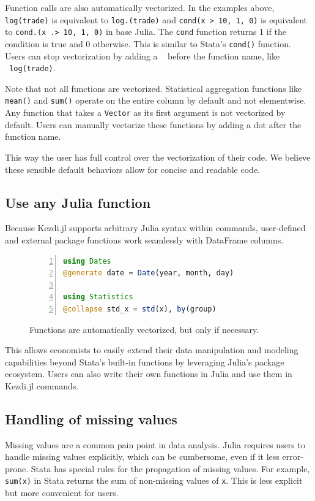 \documentclass{juliacon}
\begin{document}
Function calls are also automatically vectorized. In the examples above, \texttt{log(trade)} is equivalent to \texttt{log.(trade)} and \texttt{cond(x > 10, 1, 0)} is equivalent to \texttt{cond.(x .> 10, 1, 0)} in base Julia. The \texttt{cond} function returns 1 if the condition is true and 0 otherwise. This is similar to Stata's \texttt{cond()} function. Users can stop vectorization by adding a \texttt{~} before the function name, like \texttt{~log(trade)}.

Note that not all functions are vectorized. Statistical aggregation functions like \texttt{mean()} and \texttt{sum()} operate on the entire column by default and not elementwise. Any function that takes a \texttt{Vector} as its first argument is not vectorized by default. Users can manually vectorize these functions by adding a dot after the function name.

This way the user has full control over the vectorization of their code. We believe these sensible default behaviors allow for concise and readable code.

\subsection{Use any Julia function}

Because Kezdi.jl supports arbitrary Julia syntax within commands, user-defined and external package functions work seamlessly with DataFrame columns.

\begin{figure}[t]
\begin{lstlisting}[language = Julia, numbers=left, numberstyle=\tiny\color{gray}]
using Dates
@generate date = Date(year, month, day)

using Statistics
@collapse std_x = std(x), by(group) 
\end{lstlisting}
	
\caption{Functions are automatically vectorized, but only if necessary.}
\label{fig:vectorization}
\end{figure}

This allows economists to easily extend their data manipulation and modeling capabilities beyond Stata's built-in functions by leveraging Julia's package ecosystem. Users can also write their own functions in Julia and use them in Kezdi.jl commands. 

\subsection{Handling of missing values}
Missing values are a common pain point in data analysis. Julia requires users to handle missing values explicitly, which can be cumbersome, even if it less error-prone. Stata has special rules for the propagation of missing values. For example, \texttt{sum(x)} in Stata returns the sum of non-missing values of \texttt{x}. This is less explicit but more convenient for users.
\end{document}
